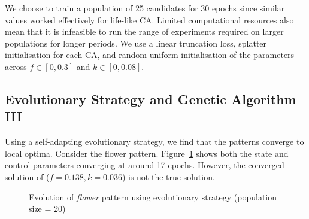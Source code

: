 We choose to train a population of 25 candidates for 30 epochs since similar values worked effectively for life-like CA. Limited computational resources also mean that it is infeasible to run the range of experiments required on larger populations for longer periods. We use a linear truncation loss, splatter initialisation for each CA, and random uniform initialisation of the parameters across $f \in [0, 0.3]$ and $k \in [0, 0.08]$.

\subsection{Evolutionary Strategy and Genetic Algorithm III}

Using a self-adapting evolutionary strategy, we find that the patterns converge to local optima. Consider the flower pattern. Figure~\ref{fig:flower-fail} shows both the state and control parameters converging at around 17 epochs. However, the converged solution of ($f = 0.138, k = 0.036$) is not the true solution.\\

\begin{figure}[!h]
\centering
            \hfill
            \hfill
            \hfill
            \hfill
            \caption{Evolution of \textit{flower} pattern using evolutionary strategy (population size = 20)}
\label{fig:flower-fail}
\end{figure}

